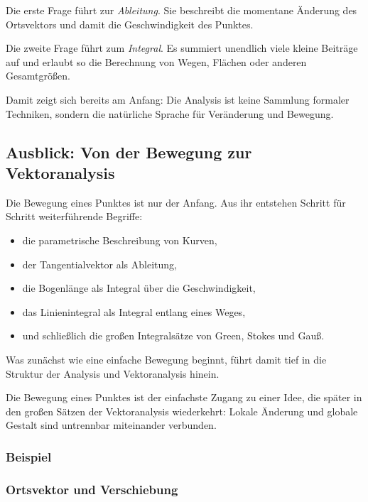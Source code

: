 Die erste Frage führt zur \emph{Ableitung}.
Sie beschreibt die momentane Änderung des Ortsvektors
und damit die Geschwindigkeit des Punktes.

Die zweite Frage führt zum \emph{Integral}.
Es summiert unendlich viele kleine Beiträge auf
und erlaubt so die Berechnung von Wegen, Flächen oder anderen Gesamtgrößen.

Damit zeigt sich bereits am Anfang:
Die Analysis ist keine Sammlung formaler Techniken,
sondern die natürliche Sprache für Veränderung und Bewegung.




\subsection*{Ausblick: Von der Bewegung zur Vektoranalysis}
Die Bewegung eines Punktes ist nur der Anfang.
Aus ihr entstehen Schritt für Schritt weiterführende Begriffe:

\begin{itemize}
	\item die parametrische Beschreibung von Kurven,
	\item der Tangentialvektor als Ableitung,
	\item die Bogenlänge als Integral über die Geschwindigkeit,
	\item das Linienintegral als Integral entlang eines Weges,
	\item und schließlich die großen Integralsätze von Green, Stokes und Gauß.
\end{itemize}

Was zunächst wie eine einfache Bewegung beginnt,
führt damit tief in die Struktur der Analysis und Vektoranalysis hinein.

\begin{NoteBox}[Ausblick]
	Die Bewegung eines Punktes ist der einfachste Zugang zu einer Idee,
	die später in den großen Sätzen der Vektoranalysis wiederkehrt:
	Lokale Änderung und globale Gestalt sind untrennbar miteinander verbunden.
\end{NoteBox}




\subsubsection*{Beispiel}
\subsubsection*{Ortsvektor und Verschiebung}

